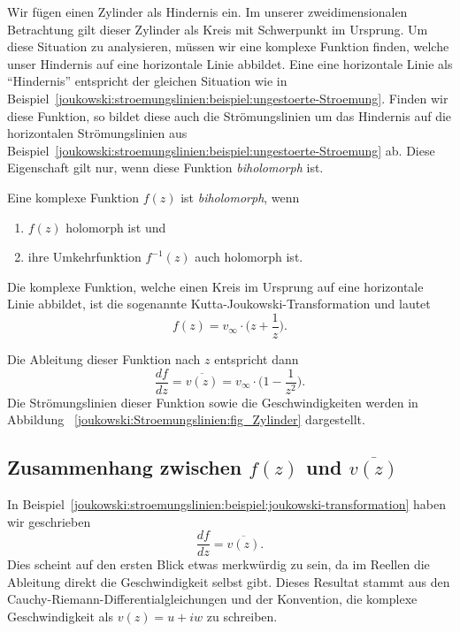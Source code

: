 		
		\begin{beispiel}
		\label{joukowski:stroemungslinien:beispiel:joukowski-transformation}
		Wir fügen einen Zylinder als Hindernis ein.
		Im unserer zweidimensionalen Betrachtung gilt dieser Zylinder als Kreis mit Schwerpunkt im Ursprung.
		Um diese Situation zu analysieren, müssen wir eine komplexe Funktion finden,
		welche unser Hindernis auf eine horizontale Linie abbildet.
		Eine eine horizontale Linie als ``Hindernis'' entspricht der gleichen Situation wie in Beispiel~\ref{joukowski:stroemungslinien:beispiel:ungestoerte-Stroemung}.
		Finden wir diese Funktion,
		so bildet diese auch die Strömungslinien um das Hindernis auf die horizontalen Strömungslinien aus Beispiel~\ref{joukowski:stroemungslinien:beispiel:ungestoerte-Stroemung} ab.
		Diese Eigenschaft gilt nur,
		wenn diese Funktion \emph{biholomorph} ist.
		
		\begin{definition}
			Eine komplexe Funktion $f(z)$ ist \emph{biholomorph}, wenn
			\begin{enumerate}
				\item $f(z)$ holomorph ist
				und
				\item ihre Umkehrfunktion $f^{-1}(z)$ auch holomorph ist.
			\end{enumerate}
		\end{definition}
		
		Die komplexe Funktion, welche einen Kreis im Ursprung auf eine horizontale Linie abbildet, ist die sogenannte Kutta-Joukowski-Transformation und lautet
		\begin{equation}
			\label{joukowski:Stroemungslinien:equation_zylinder}
			f(z)
			=
			v_\infty \cdot \biggl(z+\frac{1}{z}\biggr).
		\end{equation}
		
		Die Ableitung dieser Funktion nach $z$ entspricht dann
		\begin{equation}
			\label{joukowski:Stroemungslinien:equation_zylinder_speed}
			\frac{df}{dz}
			=
			\overline{v(z)}
			=
			v_\infty \cdot \biggl(1 - \frac{1}{z^2}\biggr).
		\end{equation} 
		Die Strömungslinien dieser Funktion sowie die Geschwindigkeiten werden in Abbildung ~\ref{joukowski:Stroemungslinien:fig_Zylinder} dargestellt.
		\end{beispiel}
		
	\subsection{Zusammenhang zwischen $f(z)$ und $\overline{v(z)}$}
		\label{joukowski:stroemungslinien:zusammenhang-fz-z}
		In Beispiel~\ref{joukowski:stroemungslinien:beispiel:joukowski-transformation}
		haben wir geschrieben
		\[
			\frac{df}{dz}
			=
			\overline{v(z)}.
		\]
		Dies scheint auf den ersten Blick etwas merkwürdig zu sein,
		da im Reellen die Ableitung direkt die Geschwindigkeit selbst gibt.
		Dieses Resultat stammt aus den Cauchy-Riemann-Differentialgleichungen und der Konvention,
		die komplexe Geschwindigkeit als $v(z) = u + iw$ zu schreiben.
		
